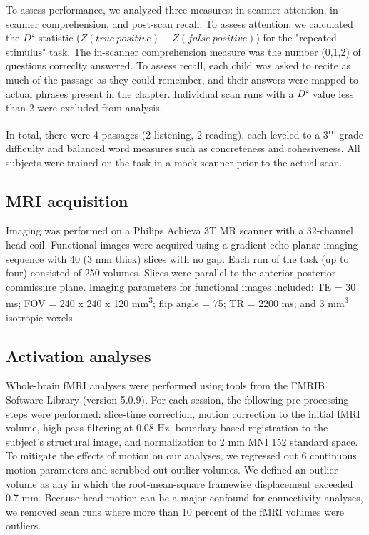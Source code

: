 To assess performance, we analyzed three measures: in-scanner attention, in-scanner comprehension, and post-scan recall. To assess attention, we calculated the $D`$ statistic ($Z(true\ positive) - Z(false\ positive)$) for the "repeated stimulus" task. The in-scanner comprehension measure was the number (0,1,2) of questions correclty answered. To assess recall, each child was asked to recite as much of the passage as they could remember, and their answers were mapped to actual phrases present in the chapter. Individual scan runs with a $D`$ value less than 2 were excluded from analysis.

In total, there were 4 passages (2 listening, 2 reading), each leveled to a 3\textsuperscript{rd} grade difficulty and balanced word measures such as concreteness and cohesiveness.  All subjects were trained on the task in a mock scanner prior to the actual scan. 


\subsection{MRI acquisition}

Imaging was performed on a Philips Achieva 3T MR scanner with a 32-channel head coil. Functional images were acquired using a gradient echo planar imaging sequence with 40 (3 mm thick) slices with no gap. Each run of the task (up to four) consisted of 250 volumes. Slices were parallel to the anterior-posterior commissure plane. Imaging parameters for functional images included: TE = 30 ms; FOV = 240 x 240 x 120 mm\textsuperscript{3}; flip angle = 75\degree; TR = 2200 ms; and 3 mm\textsuperscript{3} isotropic voxels.

\subsection{Activation analyses}

Whole-brain fMRI analyses were performed using tools from the FMRIB Software Library (version 5.0.9). For each session, the following pre-processing steps were performed:  slice-time correction, motion correction to the initial fMRI volume, high-pass filtering at 0.08 Hz, boundary-based registration to the subject's structural image, and normalization to 2 mm MNI 152 standard space. To mitigate the effects of motion on our analyses, we regressed out 6 continuous motion parameters and scrubbed out outlier volumes. We defined an outlier volume as any in which the root-mean-square framewise displacement exceeded 0.7 mm. Because head motion can be a major confound for connectivity analyses, we removed scan runs where more than 10 percent of the fMRI volumes were outliers.

